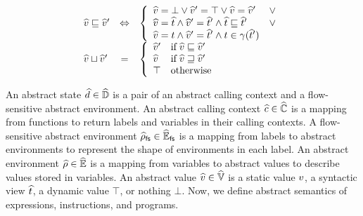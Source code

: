 \begin{itemize}
\[\begin{array}{lcl}
        \widehat{v} \sqsubseteq \widehat{v}' &\Leftrightarrow& \left\{
          \begin{array}{ll}
            \widehat{v} = \bot \vee \widehat{v}' = \top \vee \widehat{v} = \widehat{v}' & \vee\\
            \widehat{v} = \widehat{t} \wedge \widehat{v}' = \widehat{t}' \wedge
            \widehat{t} \sqsubseteq \widehat{t}' &\vee\\
            \widehat{v} = t \wedge \widehat{v}' = \widehat{t}' \wedge t \in
            \gamma(\widehat{t}')\\
          \end{array}
        \right.\\

        \widehat{v} \sqcup \widehat{v}' &=& \left\{
          \begin{array}{ll}
            \widehat{v}' & \text{if} \; \widehat{v} \sqsubseteq \widehat{v}'\\
            \widehat{v} & \text{if} \; \widehat{v} \sqsupseteq \widehat{v}'\\
            \top & \text{otherwise}\\
          \end{array}
        \right.\\
      \end{array}
    \]
\end{itemize}

An abstract state $\widehat{d} \in \widehat{\mathbb{D}}$ is a pair of an abstract calling
context and a flow-sensitive abstract environment.  An abstract calling context
$\widehat{c} \in \widehat{\mathbb{C}}$ is a mapping from functions to return labels and
variables in their calling contexts. A flow-sensitive abstract environment
$\widehat{\rho}_{\textsf{fs}} \in \widehat{\mathbb{E}}_{\textsf{fs}}$ is a mapping from labels to abstract environments to
represent the shape of environments in each label. An abstract environment
$\widehat{\rho} \in \widehat{\mathbb{E}}$ is a mapping from variables to abstract values to describe
values stored in variables. An abstract value $\widehat{v} \in \widehat{\mathbb{V}}$ is a static
value $v$, a syntactic view $\widehat{t}$, a dynamic value $\top$, or nothing
$\bot$. Now, we define abstract semantics of expressions, instructions, and
programs.

